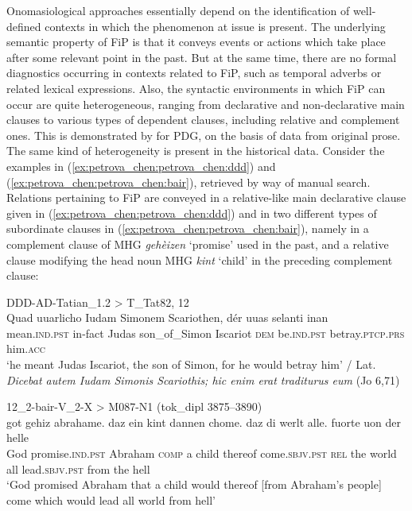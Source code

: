 \documentclass[output=paper,colorlinks,citecolor=brown]{langscibook}
\begin{document}
\largerpage[1]

Onomasiological approaches essentially depend on the identification of well-defined contexts in which the phenomenon at issue is present. The underlying semantic property of FiP is that it conveys events or actions which take place after some relevant point in the past. But at the same time, there are no formal diagnostics occurring in contexts related to FiP, such as temporal adverbs or related lexical expressions. Also, the syntactic environments in which FiP can occur are quite heterogeneous, ranging from declarative and non-declarative main clauses to various types of dependent clauses, including relative and complement ones. This is demonstrated by \citet[149–152]{Thieroff1992} for PDG, on the basis of data from original prose. The same kind of heterogeneity is present in the historical data. Consider the examples in (\ref{ex:petrova_chen:petrova_chen:ddd}) and (\ref{ex:petrova_chen:petrova_chen:bair}), retrieved by way of manual search. Relations pertaining to FiP are conveyed in a relative-like main declarative clause given in (\ref{ex:petrova_chen:petrova_chen:ddd}) and in two different types of subordinate clauses in (\ref{ex:petrova_chen:petrova_chen:bair}), namely in a complement clause of MHG \textit{gehèizen} ‘promise’ used in the past, and a relative clause modifying the head noun MHG \textit{kint} ‘child’ in the preceding complement clause:

\ea \label{ex:petrova_chen:petrova_chen:ddd} DDD-AD-Tatian\_1.2 > T\_Tat82, 12\\
\gll Quad uuarlicho Iudam Simonem Scariothen, dér uuas selanti inan\\
mean.\textsc{ind.pst} in-fact Judas son\_of\_Simon Iscariot \textsc{dem} be.\textsc{ind.pst} betray.\textsc{ptcp.prs} him.\textsc{acc}\\
\glt ‘he meant Judas Iscariot, the son of Simon, for he would betray him’ / Lat. \textit{Dicebat autem Iudam Simonis Scariothis; hic enim erat traditurus eum }(Jo 6,71)
\z

\ea \label{ex:petrova_chen:petrova_chen:bair} 12\_2-bair-V\_2-X > M087-N1 (tok\_dipl 3875–3890)\\
\gll got gehiz abrahame. daz ein kint dannen chome. daz di werlt alle. fuorte uon der helle\\
God promise.\textsc{ind.pst} Abraham \textsc{comp} a child thereof come.\textsc{sbjv.pst} \textsc{rel} the world all lead.\textsc{sbjv.pst} from the hell\\
\glt ‘God promised Abraham that a child would thereof [from Abraham’s people] come which would lead all world from hell’
\z
\end{document}

